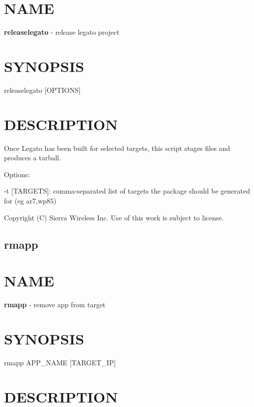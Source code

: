 \section*{N\+A\+M\+E}

{\bfseries releaselegato} -\/ release legato project

\section*{S\+Y\+N\+O\+P\+S\+I\+S}

{\ttfamily releaselegato \mbox{[}O\+P\+T\+I\+O\+N\+S\mbox{]}}~\newline


\section*{D\+E\+S\+C\+R\+I\+P\+T\+I\+O\+N}

Once Legato has been built for selected targets, this script stages files and produces a tarball.

Options\+:
\begin{DoxyItemize}
\item -\/t \mbox{[}T\+A\+R\+G\+E\+T\+S\mbox{]}\+: comma-\/separated list of targets the package should be generated for (eg \textquotesingle{}ar7,wp85\textquotesingle{})
\end{DoxyItemize}



 Copyright (C) Sierra Wireless Inc. Use of this work is subject to license. \hypertarget{toolsHost_rmapp}{}\subsection{rmapp}\label{toolsHost_rmapp}
\section*{N\+A\+M\+E}

{\bfseries rmapp} -\/ remove app from target

\section*{S\+Y\+N\+O\+P\+S\+I\+S}

{\ttfamily rmapp A\+P\+P\+\_\+\+N\+A\+M\+E \mbox{[}T\+A\+R\+G\+E\+T\+\_\+\+I\+P\mbox{]}}~\newline


\section*{D\+E\+S\+C\+R\+I\+P\+T\+I\+O\+N}

